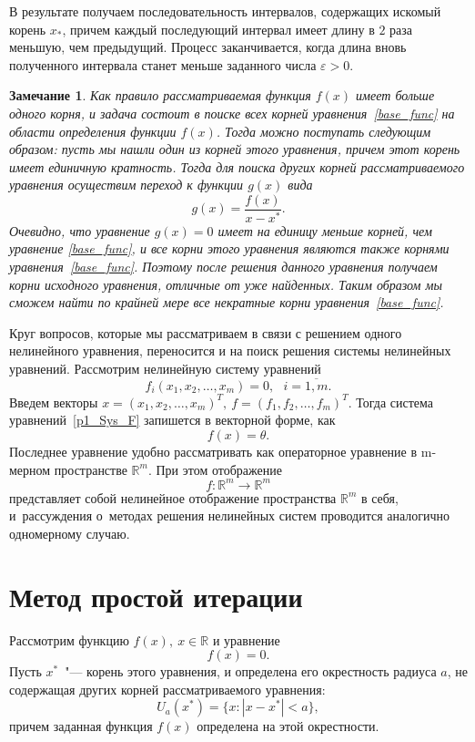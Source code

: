 \documentclass[11pt,a4paper,twoside]{report}
\numberwithin{equation}{section}
\theoremstyle{definition}
\theoremstyle{plain}
\newtheorem*{note*}{Замечание}
\begin{document}
В результате получаем последовательность интервалов, содержащих искомый корень
$x_*$, причем каждый последующий интервал имеет длину в $2$ раза меньшую, чем
предыдущий. Процесс заканчивается, когда длина вновь полученного интервала станет
меньше заданного числа $\varepsilon > 0$.
%
\begin{note*}
%
Как правило рассматриваемая функция $f(x)$ имеет больше одного корня, и задача
состоит в поиске всех корней уравнения~\eqref{base_func} на области определения
функции $f(x)$. Тогда можно поступать следующим образом: пусть мы нашли один
из корней этого уравнения, причем этот корень имеет единичную
кратность. Тогда для поиска других корней рассматриваемого уравнения осуществим
переход к функции $g(x)$ вида
%
$$
    g(x)=\frac{f(x)}{x-x^*}.
$$
%
Очевидно, что уравнение $g(x)=0$ имеет на единицу меньше корней, чем уравнение
\eqref{base_func}, и все корни этого уравнения являются также корнями
уравнения~\eqref{base_func}. Поэтому после решения данного уравнения получаем корни
исходного уравнения, отличные от уже найденных. Таким образом мы сможем найти
по крайней мере все некратные корни уравнения~\eqref{base_func}.
%
\end{note*}
%
Круг вопросов, которые мы рассматриваем в связи с решением одного
нелинейного уравнения, переносится и на поиск решения системы нелинейных
уравнений. Рассмотрим нелинейную систему уравнений
%
\begin{equation}
    f_i(x_1,x_2, \ldots, x_m) = 0, ~~~i=\overline{1,m}.
    \label{p1_Sys_F}
\end{equation}
%
Введем векторы
$
    x=(x_1,x_2, \ldots, x_m)^T,~
    f=(f_1,f_2,\ldots,f_m)^T.
$
Тогда система уравнений~\eqref{p1_Sys_F} запишется в векторной форме, как
%
$$
    f(x) = \theta.
$$
%
Последнее уравнение удобно рассматривать как операторное уравнение в m-мерном
пространстве $\mathbb{R}^m$. При этом отображение
%
$$
    f\colon\mathbb{R}^m\longrightarrow\mathbb{R}^m
$$
%
представляет собой нелинейное отображение пространства $\mathbb{R}^m$ в себя,
и~рассуждения о~методах решения нелинейных систем проводится
аналогично одномерному случаю.

\section{Метод простой итерации}
%
Рассмотрим функцию $f(x), ~x\in \mathbb{R}$ и уравнение
%
\begin{equation}
%
    \label{base_func2}
    f(x)=0.
%
\end{equation}
%
Пусть $x^*$~"--- корень этого уравнения, и определена его
окрестность радиуса $a$, не содержащая других корней рассматриваемого
уравнения:
%
$$
    U_a(x^*)=\{x:|x-x^*| < a\},
$$
%
причем заданная функция $f(x)$ определена на этой окрестности.
\end{document}
